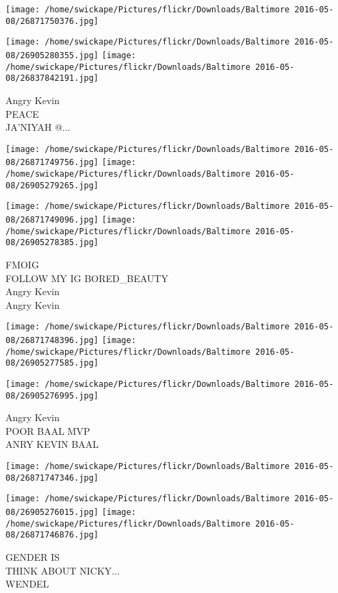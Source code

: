\documentclass[10pt,letterpaper]{article}
\begin{document}
\texttt{[image: /home/swickape/Pictures/flickr/Downloads/Baltimore 2016-05-08/26871750376.jpg]}

\vspace{0.25in}
\texttt{[image: /home/swickape/Pictures/flickr/Downloads/Baltimore 2016-05-08/26905280355.jpg]}
\texttt{[image: /home/swickape/Pictures/flickr/Downloads/Baltimore 2016-05-08/26837842191.jpg]}

Angry Kevin\\
PEACE\\
JA'NIYAH @...
\pagebreak

\texttt{[image: /home/swickape/Pictures/flickr/Downloads/Baltimore 2016-05-08/26871749756.jpg]}
\texttt{[image: /home/swickape/Pictures/flickr/Downloads/Baltimore 2016-05-08/26905279265.jpg]}

\texttt{[image: /home/swickape/Pictures/flickr/Downloads/Baltimore 2016-05-08/26871749096.jpg]}
\texttt{[image: /home/swickape/Pictures/flickr/Downloads/Baltimore 2016-05-08/26905278385.jpg]}

FMOIG\\
FOLLOW MY IG BORED\_BEAUTY\\
Angry Kevin\\
Angry Kevin
\pagebreak

\texttt{[image: /home/swickape/Pictures/flickr/Downloads/Baltimore 2016-05-08/26871748396.jpg]}
\texttt{[image: /home/swickape/Pictures/flickr/Downloads/Baltimore 2016-05-08/26905277585.jpg]}

\texttt{[image: /home/swickape/Pictures/flickr/Downloads/Baltimore 2016-05-08/26905276995.jpg]}

Angry Kevin\\
POOR BAAL MVP\\
ANRY KEVIN BAAL
\pagebreak

\texttt{[image: /home/swickape/Pictures/flickr/Downloads/Baltimore 2016-05-08/26871747346.jpg]}

\vspace{0.25in}
\texttt{[image: /home/swickape/Pictures/flickr/Downloads/Baltimore 2016-05-08/26905276015.jpg]}
\texttt{[image: /home/swickape/Pictures/flickr/Downloads/Baltimore 2016-05-08/26871746876.jpg]}

GENDER IS\\
THINK ABOUT NICKY...\\
WENDEL
\pagebreak
\end{document}
